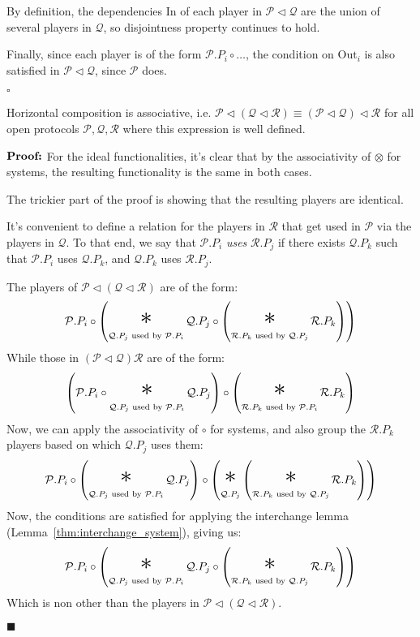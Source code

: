 \begin{definition}
By definition, the dependencies $\text{In}$ of each player in $\mathcal{P} \lhd \mathcal{Q}$
are the union of several players in $\mathcal{Q}$, so disjointness property
continues to hold.

Finally, since each player is of the form $\mathcal{P}.P_i \circ \ldots$,
the condition on $\text{Out}_i$ is also satisfied in $\mathcal{P} \lhd \mathcal{Q}$,
since $\mathcal{P}$ does.

$\square$

\end{definition}

\begin{lemma}
Horizontal composition is associative, i.e.
${\mathcal{P} \lhd (\mathcal{Q} \lhd \mathcal{R}) \equiv (\mathcal{P} \lhd \mathcal{Q}) \lhd \mathcal{R}}$
for all open protocols $\mathcal{P}, \mathcal{Q}, \mathcal{R}$ where this expression is well defined.

$\textbf{Proof:}$
For the ideal functionalities, it's clear that by the associativity
of $\otimes$ for systems, the resulting functionality is the same
in both cases.

The trickier part of the proof is showing that the resulting players
are identical.

It's convenient to define a relation for the players in $\mathcal{R}$
that get used in $\mathcal{P}$ via the players in $\mathcal{Q}$.
To that end, we say that $\mathcal{P}.P_i$ \emph{uses} $\mathcal{R}.P_j$
if there exists $\mathcal{Q}.P_k$ such that $\mathcal{P}.P_i$ uses
$\mathcal{Q}.P_k$, and $\mathcal{Q}.P_k$ uses $\mathcal{R}.P_j$.

The players of $\mathcal{P} \lhd (\mathcal{Q} \lhd \mathcal{R})$ are of the form:
$$
  \mathcal{P}.P_i \circ
  \left( \bigast_{\mathcal{Q}.P_j \text{ used by } \mathcal{P}.P_i } 
  \mathcal{Q}.P_j \circ
  \left( \bigast_{\mathcal{R}.P_k \text{ used by } \mathcal{Q}.P_j } \mathcal{R}.P_k
  \right)
  \right)
$$
While those in $(\mathcal{P} \lhd \mathcal{Q}) \mathcal{R}$ are of the form:
$$
  \left( \mathcal{P}.P_i \circ
  \bigast_{\mathcal{Q}.P_j \text{ used by } \mathcal{P}.P_i } 
  \mathcal{Q}.P_j
  \right)
  \circ
  \left(\bigast_{\mathcal{R}.P_k \text{ used by } \mathcal{P}.P_i } \mathcal{R}.P_k
  \right)
$$
Now, we can apply the associativity of $\circ$ for systems, and also
group the $\mathcal{R}.P_k$ players based on which $\mathcal{Q}.P_j$ uses them:
$$
  \mathcal{P}.P_i \circ
  \left(
  \bigast_{\mathcal{Q}.P_j \text{ used by } \mathcal{P}.P_i } 
  \mathcal{Q}.P_j
  \right)
  \circ
  \left(
    \bigast_{\mathcal{Q}.P_j}
  \left(\bigast_{\mathcal{R}.P_k \text{ used by } \mathcal{Q}.P_j } \mathcal{R}.P_k
  \right)
  \right)
$$
Now, the conditions are satisfied for applying the interchange lemma (Lemma~\ref{thm:interchange_system}),
giving us:
$$
  \mathcal{P}.P_i \circ
  \left( \bigast_{\mathcal{Q}.P_j \text{ used by } \mathcal{P}.P_i } 
  \mathcal{Q}.P_j \circ
  \left( \bigast_{\mathcal{R}.P_k \text{ used by } \mathcal{Q}.P_j } \mathcal{R}.P_k
  \right)
  \right)
$$
Which is non other than the players in $\mathcal{P} \lhd (\mathcal{Q} \lhd \mathcal{R})$.

$\blacksquare$
\end{lemma}


